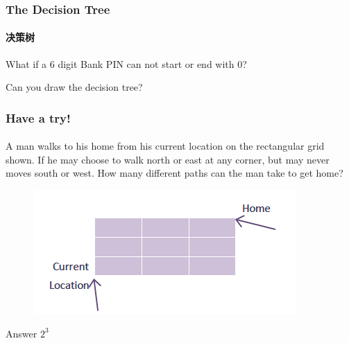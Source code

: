 \documentclass[
	11pt, %
	handout,
]{beamer}
\begin{document}

\begin{frame}
	\frametitle{The Decision Tree} %
	\framesubtitle{决策树}
	What if a 6 digit Bank PIN can not start or end with 0?

	\bigskip \bigskip
	\pause Can you draw the decision tree?
\end{frame}



\begin{frame}
	\frametitle{Have a try!}
	\framesubtitle{}
A man walks to his home from his current location on the rectangular grid shown. If
he may choose to walk north or east at any corner, but may never moves south or
west. How many different paths can the man take to get home?
	\begin{figure}
		\includegraphics[width=0.5\linewidth]{Man_Walk.png}
	\end{figure}
\bigskip
\pause
Answer \textbf{$2^3$}
\bigskip

\end{frame}

\end{document}
